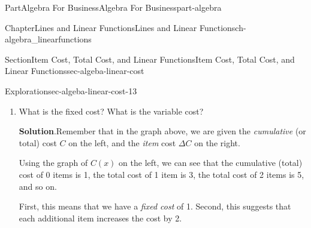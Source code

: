 \documentclass[oneside,10pt,]{tufte-book}
\newcommand{\blocktitlefont}{\relax}
\numberwithin{equation}{chapter}
\def \tikzhistogram (#1,#2){\draw[fill=blue,opacity=0.3] ({#1+((\xtwo-\xmin)/5)},#2) rectangle ({#1-((\xtwo-\xmin)/5)},0); \draw[draw,thick] ({#1+((\xtwo-\xmin)/5)},#2) rectangle ({#1-((\xtwo-\xmin)/5)},0); \node[draw,fill=blue, circle,inner sep=2.5pt] at (#1,#2) {};}
\begin{document}
\begin{partptx}{Part}{Algebra For Business}{}{Algebra For Business}{}{}{part-algebra}
\begin{chapterptx}{Chapter}{Lines and Linear Functions}{}{Lines and Linear Functions}{}{}{ch-algebra_linearfunctions}
\begin{sectionptx}{Section}{Item Cost, Total Cost, and Linear Functions}{}{Item Cost, Total Cost, and Linear Functions}{}{}{sec-algeba-linear-cost}
\begin{exploration}{Exploration}{}{sec-algeba-linear-cost-13}
\begin{image}{0.25}{0.5}{0.25}{}
{\begin{tikzpicture}[xscale=\xscale,yscale=\yscale]
\end{tikzpicture}
\quad
{}
}%
\end{image}%
\begin{enumerate}[font=\bfseries,label=(\alph*),ref=\alph*]%
\item{}What is the fixed cost? What is the variable cost?%
\par\smallskip%
\noindent\textbf{\blocktitlefont Solution}.\hypertarget{sec-algeba-linear-cost-13-2-2}{}\quad{}Remember that in the graph above, we are given the \emph{cumulative} (or total) cost \(C\) on the left, and the \emph{item} cost \(\Delta C\) on the right.%
\par
Using the graph of \(C(x)\) on the left, we can see that the cumulative (total) cost of 0 items is \textdollar{}1, the total cost of 1 item is \textdollar{}3, the total cost of 2 items is 5, and so on.%
\par
First, this means that we have a \emph{fixed cost} of \textdollar{}1.  Second, this suggests that each additional item increases the cost by \textdollar{}2.%

\end{enumerate}
\end{exploration}
\end{sectionptx}
\end{chapterptx}
\end{partptx}
\end{document}
